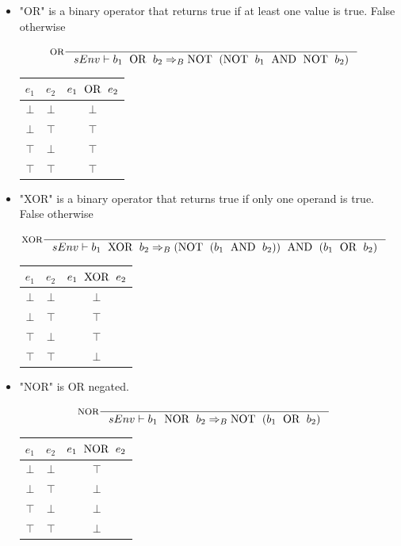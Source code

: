 \begin{itemize}
\item "OR" is a binary operator that returns true if at least one value is true. False otherwise

\begin{align*}
&\inference[OR]{}
                 {sEnv \vdash b_1 \Tor b_2 \Rightarrow_B \Tnot(\Tnot b_1 \Tand \Tnot b_2)}
\end{align*}

\begin{center}
\begin{tabular}{ | c | c | c | }
\hline
$e_1$ & $e_2$ & $e_1 \text{\; OR \;} e_2$ \\\hline
$\bot$ & $\bot$ & $\bot$ \\\hline
$\bot$ & $\top$ & $\top$ \\\hline
$\top$ & $\bot$ & $\top$ \\\hline
$\top$ & $\top$ & $\top$ \\\hline
\end{tabular}
\end{center}

\item "XOR" is a binary operator that returns true if only one operand is true. False otherwise

\begin{align*}
&\inference[XOR]{}
                  {sEnv \vdash b_1 \Txor b_2 \Rightarrow_B (\Tnot(b_1 \Tand b_2)) \Tand (b_1 \Tor b_2)}
\end{align*}

\begin{center}
\begin{tabular}{ | c | c | c | }
\hline
$e_1$ & $e_2$ & $e_1 \text{\; XOR \;} e_2$ \\\hline
$\bot$ & $\bot$ & $\bot$ \\\hline
$\bot$ & $\top$ & $\top$ \\\hline
$\top$ & $\bot$ & $\top$ \\\hline
$\top$ & $\top$ & $\bot$ \\\hline
\end{tabular}
\end{center}

\item "NOR" is OR negated.

\begin{align*}
&\inference[NOR]{}
                   {sEnv \vdash b_1 \Tnor b_2 \Rightarrow_B \Tnot( b_1 \Tor b_2 )}
\end{align*}

\begin{center}
\begin{tabular}{ | c | c | c | }
\hline
$e_1$ & $e_2$ & $e_1 \text{\; NOR \;} e_2$ \\\hline
$\bot$ & $\bot$ & $\top$ \\\hline
$\bot$ & $\top$ & $\bot$ \\\hline
$\top$ & $\bot$ & $\bot$ \\\hline
$\top$ & $\top$ & $\bot$ \\\hline
\end{tabular}
\end{center}


\end{itemize}
